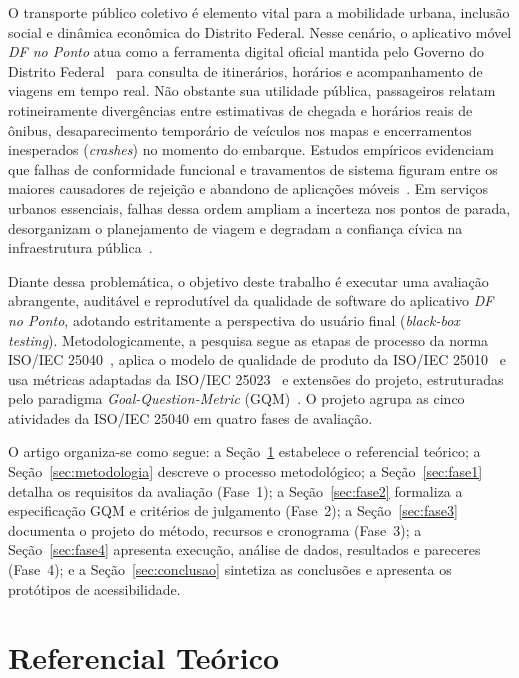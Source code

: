 \documentclass[11pt,a4paper]{article}
\begin{document}
O transporte público coletivo é elemento vital para a mobilidade urbana, inclusão social e dinâmica econômica do Distrito Federal. Nesse cenário, o aplicativo móvel \textit{DF no Ponto} atua como a ferramenta digital oficial mantida pelo Governo do Distrito Federal~\cite{semob2026} para consulta de itinerários, horários e acompanhamento de viagens em tempo real. Não obstante sua utilidade pública, passageiros relatam rotineiramente divergências entre estimativas de chegada e horários reais de ônibus, desaparecimento temporário de veículos nos mapas e encerramentos inesperados (\textit{crashes}) no momento do embarque. Estudos empíricos evidenciam que falhas de conformidade funcional e travamentos de sistema figuram entre os maiores causadores de rejeição e abandono de aplicações móveis~\cite{khalid2015}. Em serviços urbanos essenciais, falhas dessa ordem ampliam a incerteza nos pontos de parada, desorganizam o planejamento de viagem e degradam a confiança cívica na infraestrutura pública~\cite{brakewood2015,watkins2011}.

Diante dessa problemática, o objetivo deste trabalho é executar uma avaliação abrangente, auditável e reprodutível da qualidade de software do aplicativo \textit{DF no Ponto}, adotando estritamente a perspectiva do usuário final (\textit{black-box testing}). Metodologicamente, a pesquisa segue as etapas de processo da norma ISO/IEC 25040~\cite{iso25040}, aplica o modelo de qualidade de produto da ISO/IEC 25010~\cite{iso25010} e usa métricas adaptadas da ISO/IEC 25023~\cite{iso25023} e extensões do projeto, estruturadas pelo paradigma \textit{Goal-Question-Metric} (GQM)~\cite{basili1988,basili1994}. O projeto agrupa as cinco atividades da ISO/IEC 25040 em quatro fases de avaliação.

O artigo organiza-se como segue: a Seção~\ref{sec:referencial} estabelece o referencial teórico; a Seção~\ref{sec:metodologia} descreve o processo metodológico; a Seção~\ref{sec:fase1} detalha os requisitos da avaliação (Fase~1); a Seção~\ref{sec:fase2} formaliza a especificação GQM e critérios de julgamento (Fase~2); a Seção~\ref{sec:fase3} documenta o projeto do método, recursos e cronograma (Fase~3); a Seção~\ref{sec:fase4} apresenta execução, análise de dados, resultados e pareceres (Fase~4); e a Seção~\ref{sec:conclusao} sintetiza as conclusões e apresenta os protótipos de acessibilidade.

\section{Referencial Teórico}
\label{sec:referencial}
\end{document}
